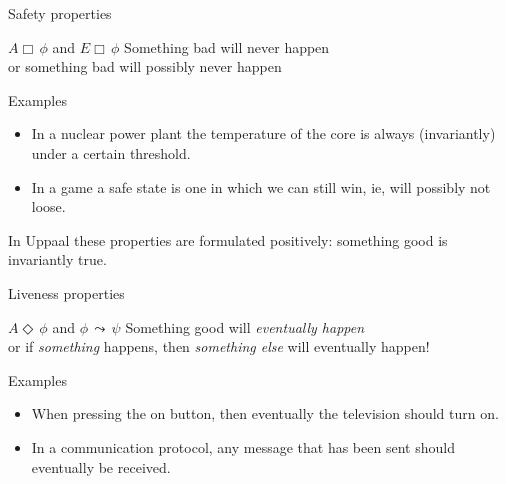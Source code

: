 \documentclass{beamer}
\def\dgold#1{{\darkgoldenrod #1}}
\def\dkb#1{{\blue #1}}
\begin{document}
\begin{slide}{Safety properties}
\small

\begin{block}{$A \Box\, \phi$ and $E \Box\, \phi$}
\vspace{5mm}
\dkb{Something bad will never happen}\\
 or \dkb{something bad will possibly never happen}
\vspace{5mm}

Examples\\
\begin{itemize}
\item \dgold{In a nuclear power plant the temperature of the core is always (invariantly) under a certain threshold}.
\item \dgold{In a game a safe state is one in which we can still win, ie, will possibly not loose}.
\end{itemize}

In Uppaal these properties are formulated positively: something good is invariantly true.
\end{block}

\end{slide}

\begin{slide}{Liveness properties}
\small

\begin{block}{$A \Diamond\, \phi$ and $\phi\, \leadsto \, \psi$}
\vspace{5mm}
\dkb{Something good will \emph{eventually happen}}\\
 or \dkb{if \emph{something} happens, then \emph{something else} will eventually happen!}
\vspace{5mm}

Examples\\
\begin{itemize}
\item \dgold{When pressing the on button, then eventually the television should turn on}.
\item \dgold{In a communication protocol, any message that has been sent should eventually be received}.
\end{itemize}

\end{block}

\end{slide}
\end{document}
